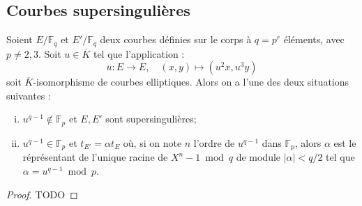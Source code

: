\documentclass[a4paper]{article} %
\numberwithin{section}{part}
\numberwithin{equation}{section}
\newcommand\GF[1]{\mathbb{F}_{#1}}
\begin{document}
\subsection{Courbes supersingulières}
\label{sec:singcurve}
\begin{prop}
\label{prop:trtwist}
Soient $E/\GF{q}$ et $E'/\GF{q}$ deux courbes définies sur le corps à $q = p^r$
éléments, avec $p\neq2,3$. Soit $u\in\overline{K}$ tel que l'application :
\begin{equation}
\overline{u} : E\longrightarrow E,\quad(x,y)\longmapsto(u^2x,u^3y)
\end{equation}
soit $\overline{K}$-isomorphisme de courbes elliptiques. Alors on a l'une des
deux situations suivantes :
\begin{enumerate}[(i)]
    \item $u^{q-1}\notin\GF{p}$ et $E, E'$ sont supersingulières;
    \item $u^{q-1}\in\GF{p}$ et $t_{E'} = \alpha t_E$ où, si on note $n$ l'ordre
    de $u^{q-1}$ dans $\GF{p}$, alors $\alpha$ est le réprésentant de l'unique
    racine de $X^n - 1 \bmod q$ de module $\vert{\alpha}\vert < q/2$ tel que
    $\alpha = u^{q-1}\bmod p$.
\end{enumerate}
\end{prop}
\begin{proof}
TODO
\end{proof}
\end{document}
